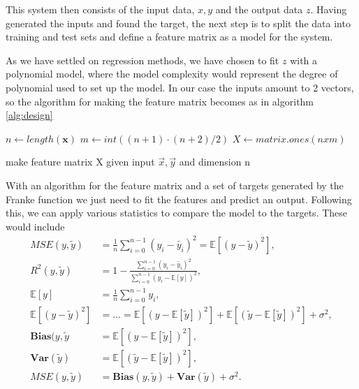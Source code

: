 \documentclass[15pt comic sans]{revtex4-2}
\begin{document}
This system then consists of the input data, $x,y$ and the output data $z$. Having generated
the inputs and found the target, the next step is to split the data into training and test sets
and define a feature matrix as a model for the system. 

As we have settled on regression methods, we have chosen to fit $z$ with a polynomial model, where
the model complexity would represent the degree of polynomial used to set up the model. In our
case the inputs amount to 2 vectors, so the algorithm for making the feature matrix becomes 
as in algorithm \ref{alg:design}

\begin{algorithm}
	\DontPrintSemicolon
	$n \gets length(\bm{x})$\;
	$m \gets int((n+1)\cdot (n+2)/2)$\;
	$X \gets matrix.ones(nxm)$\;
	\;
\caption{make feature matrix X given input $\vec{x}, \vec{y}$ and dimension n}
\label{alg:design}
\end{algorithm}

With an algorithm for the feature matrix and a set of targets generated by the Franke 
function we just need to fit the features and predict an output. Following this, we can 
apply various statistics to compare the model to the targets. These would include
\begin{align}
	MSE(y, \tilde{y}) &= \frac{1}{n}\sum_{i=0}^{n-1}(y_i - \tilde{y_i})^2
		= \mathbb{E}[(y - \tilde{y})^2],
		\label{MSE} \\
	R^2(y, \tilde{y}) &= 1 - \frac{\sum_{i=0}^{n-1}(y_i - \tilde{y_i})^2}
		{\sum_{i=0}^{n-1}(y_i - \mathbb{E}[y])^2} 
		\label{R2}, \\
	\mathbb{E}[y] &= \frac{1}{n}\sum_{i=0}^{n-1} y_i \label{mean}, \\
	\mathbb{E}[(y - \tilde{y})^2] 
		&=...= \mathbb{E}[(y -\mathbb{E}[\tilde{y}])^2] 
			+ \mathbb{E}[(\tilde{y} - \mathbb{E}[\tilde{y}])^2] 
			+ \sigma^2 \label{bias-variance-error}, \\
	\mathbf{Bias}(y, \tilde{y} &= \mathbb{E}[(y -\mathbb{E}[\tilde{y}])^2] ,
		\label{bias} \\
	\mathbf{Var}(\tilde{y}) &= \mathbb{E}[(\tilde{y} - \mathbb{E}[\tilde{y}])^2] ,
		\label{variance} \\
	MSE(y, \tilde{y}) &= \mathbf{Bias}(y, \tilde{y}) + \mathbf{Var}(\tilde{y}) + \sigma^2
		\label{bias-variance}.
\end{align}
\end{document}
